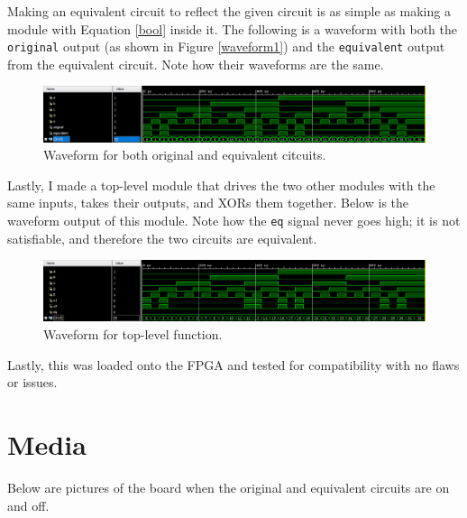 \documentclass{article}
\renewcommand{\c}[1]{\texttt{#1}}
\begin{document}
\pagebreak

Making an equivalent circuit to reflect the given circuit
is as simple as making a module with Equation \ref{bool} inside it.
The following is a waveform with both the \c{original}
output (as shown in Figure \ref{waveform1}) and the
\c{equivalent} output from the equivalent circuit. Note how
their waveforms are the same.

\begin{figure}[H]
    \centering
    \includegraphics[width=\textwidth]{Images/waveform2}
    \caption{Waveform for both original and equivalent citcuits.}
    \label{waveform2}
\end{figure}

Lastly, I made a top-level module that drives the two
other modules with the same inputs, takes their outputs, and
XORs them together. Below is the waveform output of this module.
Note how the \c{eq} signal never goes high; it is not
satisfiable, and therefore the two circuits are equivalent.

\begin{figure}[H]
    \centering
    \includegraphics[width=\textwidth]{Images/waveform3}
    \caption{Waveform for top-level function.}
    \label{waveform3}
\end{figure}

Lastly, this was loaded onto the FPGA and tested for
compatibility with no flaws or issues.

\section{Media} Below are pictures of the board when the
original and equivalent circuits are on and off.
\end{document}
